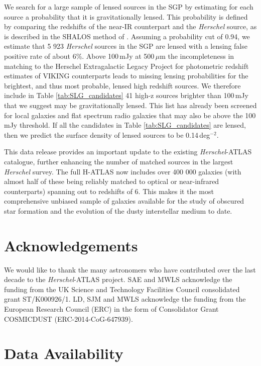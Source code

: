 \documentclass[fleqn,usenatbib]{mnras}
\begin{document}
We search for a large sample of lensed sources in the SGP by estimating for each source a probability that it is gravitationally lensed. This probability is defined by comparing the redshifts of the near-IR counterpart and the \textit{Herschel} source, as is described in the SHALOS method of \citealt{GonzalezNuevo_2019}. Assuming a probability cut of 0.94, we estimate that 5 923 \textit{Herschel} sources in the SGP are lensed with a lensing false positive rate of about 6\%. Above 100\,mJy at 500\,$\mu$m the incompleteness in matching to the Herschel Extragalactic Legacy Project for photometric redshift estimates of VIKING counterparts leads to missing lensing probabilities for the brightest, and thus most probable, lensed high redshift sources. We therefore include in Table \ref{tab:SLG_candidates} 41 high-z sources brighter than 100\,mJy that we suggest may be gravitationally lensed. This list has already been screened for local galaxies and flat spectrum radio galaxies that may also be above the 100\,mJy threshold. If all the candidates in Table \ref{tab:SLG_candidates} are lensed, then we predict the surface density of lensed sources to be 0.14\,deg$^{-2}$.

This data release provides an important update to the existing \textit{Herschel}-ATLAS catalogue, further enhancing the number of matched sources in the largest \textit{Herschel} survey. The full H-ATLAS now includes over 400 000 galaxies (with almost half of these being reliably matched to optical or near-infrared counterparts) spanning out to redshifts of 6. This makes it the most comprehensive unbiased sample of galaxies available for the study of obscured star formation and the evolution of the dusty interstellar medium to date. 

\section*{Acknowledgements}

We would like to thank the many astronomers who have contributed over the last decade to the \textit{Herschel}-ATLAS project. SAE and MWLS acknowledge the funding from the UK Science and Technology Facilities Council consolidated grant ST/K000926/1. LD, SJM and MWLS acknowledge the funding from the European Research Council (ERC) in the form of Consolidator Grant COSMICDUST (ERC-2014-CoG-647939).

\section*{Data Availability}
\end{document}
